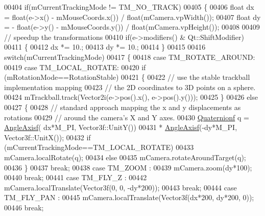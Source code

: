\begin{DoxyCode}
00404     \textcolor{keywordflow}{if}(mCurrentTrackingMode != TM\_NO\_TRACK)
00405     \{
00406         \textcolor{keywordtype}{float} dx =   float(e->x() - mMouseCoords.x()) / \textcolor{keywordtype}{float}(mCamera.vpWidth());
00407         \textcolor{keywordtype}{float} dy = - float(e->y() - mMouseCoords.y()) / \textcolor{keywordtype}{float}(mCamera.vpHeight());
00408 
00409         \textcolor{comment}{// speedup the transformations}
00410         \textcolor{keywordflow}{if}(e->modifiers() & Qt::ShiftModifier)
00411         \{
00412           dx *= 10.;
00413           dy *= 10.;
00414         \}
00415 
00416         \textcolor{keywordflow}{switch}(mCurrentTrackingMode)
00417         \{
00418           \textcolor{keywordflow}{case} TM\_ROTATE\_AROUND:
00419           \textcolor{keywordflow}{case} TM\_LOCAL\_ROTATE:
00420             \textcolor{keywordflow}{if} (mRotationMode==RotationStable)
00421             \{
00422               \textcolor{comment}{// use the stable trackball implementation mapping}
00423               \textcolor{comment}{// the 2D coordinates to 3D points on a sphere.}
00424               mTrackball.track(Vector2i(e->pos().x(), e->pos().y()));
00425             \}
00426             \textcolor{keywordflow}{else}
00427             \{
00428               \textcolor{comment}{// standard approach mapping the x and y displacements as rotations}
00429               \textcolor{comment}{// around the camera's X and Y axes.}
00430               \hyperlink{group___geometry___module_class_eigen_1_1_quaternion}{Quaternionf} q = \hyperlink{group___geometry___module_gadc7128416da41ca99bb8af814b78599e}{AngleAxisf}( dx*M\_PI, Vector3f::UnitY())
00431                             * \hyperlink{group___geometry___module_gadc7128416da41ca99bb8af814b78599e}{AngleAxisf}(-dy*M\_PI, Vector3f::UnitX());
00432               \textcolor{keywordflow}{if} (mCurrentTrackingMode==TM\_LOCAL\_ROTATE)
00433                 mCamera.localRotate(q);
00434               \textcolor{keywordflow}{else}
00435                 mCamera.rotateAroundTarget(q);
00436             \}
00437             \textcolor{keywordflow}{break};
00438           \textcolor{keywordflow}{case} TM\_ZOOM :
00439             mCamera.zoom(dy*100);
00440             \textcolor{keywordflow}{break};
00441           \textcolor{keywordflow}{case} TM\_FLY\_Z :
00442             mCamera.localTranslate(Vector3f(0, 0, -dy*200));
00443             \textcolor{keywordflow}{break};
00444           \textcolor{keywordflow}{case} TM\_FLY\_PAN :
00445             mCamera.localTranslate(Vector3f(dx*200, dy*200, 0));
00446             \textcolor{keywordflow}{break};

\end{DoxyCode}
